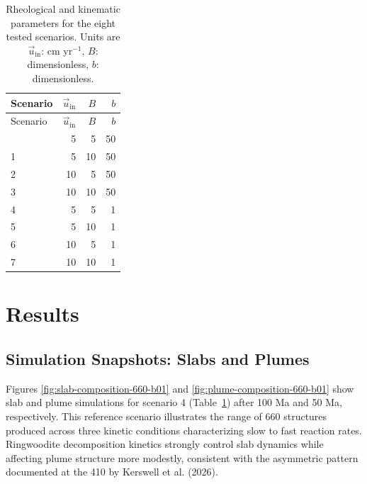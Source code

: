 \documentclass[draft,linenumbers]{agujournal2019}
\begin{document}
\begin{longtable}[]{@{}lrrr@{}}
\caption{Rheological and kinematic parameters for the eight tested
scenarios. Units are \(\vec{u}_\mathrm{in}\): cm yr\(^{-1}\), \(B\):
dimensionless, \(b\):
dimensionless.}\label{tbl:scenarios}\tabularnewline
\toprule\noalign{}
Scenario & \(\vec{u}_\mathrm{in}\) & \(B\) & \(b\) \\
\midrule\noalign{}
\endfirsthead
\toprule\noalign{}
Scenario & \(\vec{u}_\mathrm{in}\) & \(B\) & \(b\) \\
\midrule\noalign{}
\endhead
\bottomrule\noalign{}
\endlastfoot
0 & 5 & 5 & 50 \\
1 & 5 & 10 & 50 \\
2 & 10 & 5 & 50 \\
3 & 10 & 10 & 50 \\
4 & 5 & 5 & 1 \\
5 & 5 & 10 & 1 \\
6 & 10 & 5 & 1 \\
7 & 10 & 10 & 1 \\
\end{longtable}

\section{Results}\label{sec:results}

\subsection{Simulation Snapshots: Slabs and
Plumes}\label{sec:simulation-snapshots}

Figures \ref{fig:slab-composition-660-b01} and
\ref{fig:plume-composition-660-b01} show slab and plume simulations for
scenario 4 (Table~\ref{tbl:scenarios}) after 100 Ma and 50 Ma,
respectively. This reference scenario illustrates the range of 660
structures produced across three kinetic conditions characterizing slow
to fast reaction rates. Ringwoodite decomposition kinetics strongly
control slab dynamics while affecting plume structure more modestly,
consistent with the asymmetric pattern documented at the 410 by Kerswell
et al. (2026).
\end{document}
